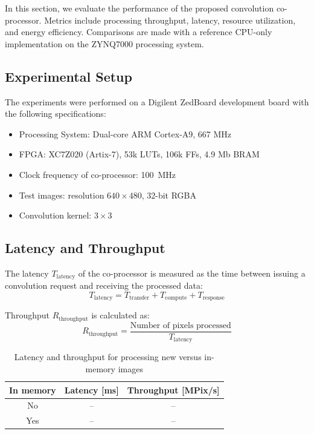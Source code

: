 \documentclass[conference]{IEEEtran}
\begin{document}
In this section, we evaluate the performance of the proposed convolution co-processor. Metrics include processing throughput, latency, resource utilization, and energy efficiency. Comparisons are made with a reference CPU-only implementation on the ZYNQ7000 processing system.

\subsection{Experimental Setup}
The experiments were performed on a Digilent ZedBoard development board with the following specifications:

\begin{itemize}[noitemsep]
  \item Processing System: Dual-core ARM Cortex-A9, 667 MHz
  \item FPGA: XC7Z020 (Artix-7), 53k LUTs, 106k FFs, 4.9 Mb BRAM
  \item Clock frequency of co-processor: \SI{100}{\MHz}
  \item Test images: resolution $640 \times 480$, 32-bit RGBA
  \item Convolution kernel: $3\times3$
\end{itemize}

\subsection{Latency and Throughput}

The latency $T_\text{latency}$ of the co-processor is measured as the time between issuing a convolution request and receiving the processed data:
\begin{equation}
T_\text{latency} = T_\text{transfer} + T_\text{compute} + T_\text{response}
\end{equation}

Throughput $R_\text{throughput}$ is calculated as:
\begin{equation}
R_\text{throughput} = \frac{\text{Number of pixels processed}}{T_\text{latency}}
\end{equation}

\begin{table}[H]
\centering
\caption{Latency and throughput for processing new versus in-memory images}
\begin{tabular}{c c c}
\hline
In memory & Latency [ms] & Throughput [MPix/s] \\
\hline
No & -- & -- \\
Yes & -- & -- \\
\hline
\end{tabular}
\label{tab:latency-throughput}
\end{table}
\end{document}
